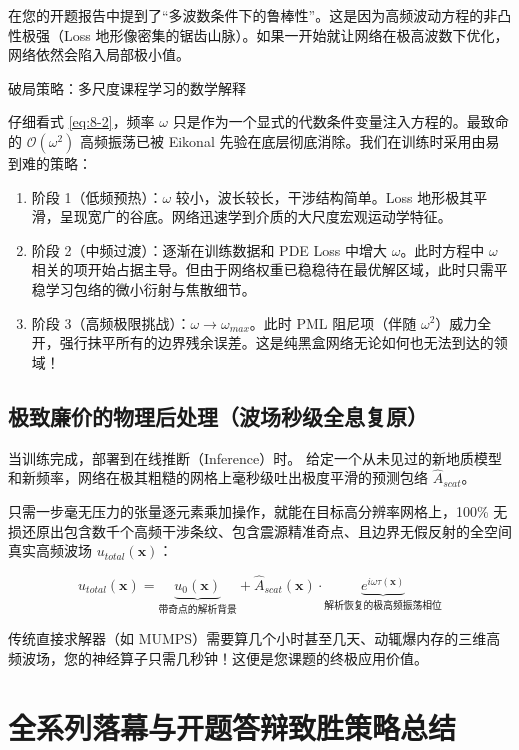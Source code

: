 \documentclass[12pt]{article}
\begin{document}
{在您的开题报告中提到了“多波数条件下的鲁棒性”。这是因为高频波动方程的非凸性极强（Loss 地形像密集的锯齿山脉）。如果一开始就让网络在极高波数下优化，网络依然会陷入局部极小值。

破局策略：多尺度课程学习的数学解释

仔细看式 \eqref{eq:8-2}，频率 $\omega$ 只是作为一个显式的代数条件变量注入方程的。最致命的 $\mathcal{O}(\omega^2)$ 高频振荡已被 Eikonal 先验在底层彻底消除。我们在训练时采用由易到难的策略：

\begin{enumerate}[leftmargin=2em]
    \item 阶段 1（低频预热）：$\omega$ 较小，波长较长，干涉结构简单。Loss 地形极其平滑，呈现宽广的谷底。网络迅速学到介质的大尺度宏观运动学特征。
    \item 阶段 2（中频过渡）：逐渐在训练数据和 PDE Loss 中增大 $\omega$。此时方程中 $\omega$ 相关的项开始占据主导。但由于网络权重已稳稳待在最优解区域，此时只需平稳学习包络的微小衍射与焦散细节。
    \item 阶段 3（高频极限挑战）：$\omega \to \omega_{max}$。此时 PML 阻尼项（伴随 $\omega^2$）威力全开，强行抹平所有的边界残余误差。这是纯黑盒网络无论如何也无法到达的领域！
\end{enumerate}

\subsection{极致廉价的物理后处理（波场秒级全息复原）}

当训练完成，部署到在线推断（Inference）时。
给定一个从未见过的新地质模型和新频率，网络在极其粗糙的网格上毫秒级吐出极度平滑的预测包络 $\hat{A}_{scat}$。

只需一步毫无压力的张量逐元素乘加操作，就能在目标高分辨率网格上，100\% 无损还原出包含数千个高频干涉条纹、包含震源精准奇点、且边界无假反射的全空间真实高频波场 $u_{total}(\mathbf{x})$：

\begin{equation}
u_{total}(\mathbf{x})
=
\underbrace{u_0(\mathbf{x})}_{\text{带奇点的解析背景}}
+
\hat{A}_{scat}(\mathbf{x}) \cdot
\underbrace{e^{i \omega \tau(\mathbf{x})}}_{\text{解析恢复的极高频振荡相位}}
\label{eq:8-4}
\end{equation}

传统直接求解器（如 MUMPS）需要算几个小时甚至几天、动辄爆内存的三维高频波场，您的神经算子只需几秒钟！这便是您课题的终极应用价值。

\section{全系列落幕与开题答辩致胜策略总结}

}
\end{document}
